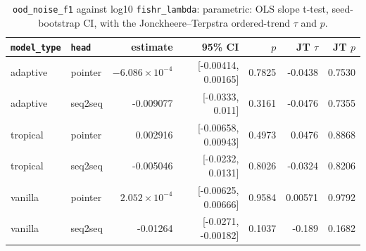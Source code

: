 \documentclass[10pt]{article}
\begin{document}
{\small
\begin{longtable}{llrrrrr}
\caption{\texttt{ood\_noise\_f1} against log10 \texttt{fishr\_lambda}: parametric: OLS slope t-test, seed-bootstrap CI, with the Jonckheere--Terpstra ordered-trend $\tau$ and $p$.}\label{tab:trend-ood_noise_f1}\\
\toprule
\texttt{model\_type} & \texttt{head} & estimate & 95\% CI & $p$ & JT $\tau$ & JT $p$\\
\midrule
\endhead
adaptive & pointer & $-6.086\times10^{-4}$ & [-0.00414, 0.00165] & 0.7825 & -0.0438 & 0.7530\\
adaptive & seq2seq & -0.009077 & [-0.0333, 0.011] & 0.3161 & -0.0476 & 0.7355\\
tropical & pointer & 0.002916 & [-0.00658, 0.00943] & 0.4973 & 0.0476 & 0.8868\\
tropical & seq2seq & -0.005046 & [-0.0232, 0.0131] & 0.8026 & -0.0324 & 0.8206\\
vanilla & pointer & $2.052\times10^{-4}$ & [-0.00625, 0.00666] & 0.9584 & 0.00571 & 0.9792\\
vanilla & seq2seq & -0.01264 & [-0.0271, -0.00182] & 0.1037 & -0.189 & 0.1682\\
\bottomrule
\end{longtable}
}
\end{document}

